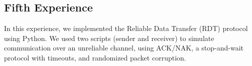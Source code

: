 \subsection{Fifth Experience}

In this experience, we implemented the Reliable Data Transfer (RDT) protocol
using Python. We used two scripts (sender and receiver) to simulate
communication over an unreliable channel, using ACK/NAK, a stop-and-wait
protocol with timeouts, and randomized packet corruption.


